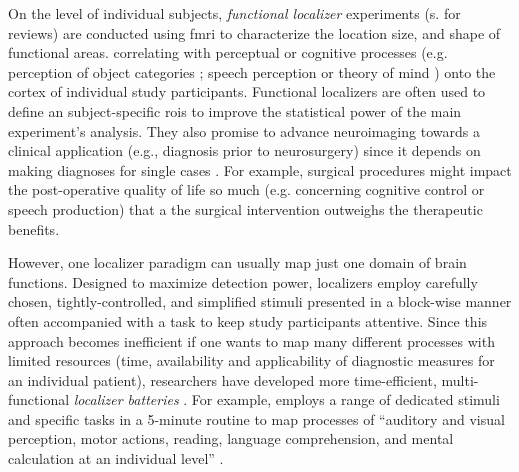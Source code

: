 



On the level of individual subjects, \textit{functional localizer} experiments
(s. \citep{saxe2006divide, friston2006critique} for reviews) are conducted using
\ac{fmri} to characterize the location size, and shape of functional areas.
correlating with perceptual or cognitive processes (e.g. perception of object
categories \citep{kanwisher1997ffa}; speech perception
\citep{fernandez2001language} or theory of mind \citep{spunt2014validating})
onto the cortex of individual study participants.
Functional localizers are often used to define an subject-specific \acp{roi} to
improve the statistical power of the main experiment's analysis.
They also promise to advance neuroimaging towards a clinical application (e.g.,
diagnosis prior to neurosurgery) since it depends on making diagnoses for single
cases \citep{wegrzyn2018thought}.
For example, surgical procedures might impact the post-operative quality of life
so much (e.g. concerning cognitive control or speech production) that a the
surgical intervention outweighs the therapeutic benefits.

However, one localizer paradigm can usually map just one domain of brain
functions.
Designed to maximize detection power, localizers employ carefully chosen,
tightly-controlled, and simplified stimuli presented in a block-wise manner
often accompanied with a task to keep study participants attentive.
Since this approach becomes inefficient if one wants to map many different
processes with limited resources (time, availability and applicability of
diagnostic measures for an individual patient), researchers have developed more
time-efficient, multi-functional \textit{localizer batteries}
\citep{barch2013function, drobyshevsky2006rapid, pinel2007fast}.
For example, \citet{pinel2007fast} employs a range of dedicated stimuli and
specific tasks in a 5-minute routine to map processes of ``auditory and visual
perception, motor actions, reading, language comprehension, and mental
calculation at an individual level'' \citep{pinel2007fast}.

